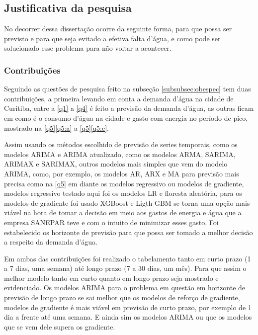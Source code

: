 \subsection{Justificativa da pesquisa} \label{subsec:justif}

No decorrer dessa dissertação ocorre da seguinte forma, para que possa ser previsto e para que seja evitado a efetiva falta d'água, e como pode ser solucionado esse problema para não voltar a acontecer.

\subsubsection{Contribui\c c\~oes} \label{subsubsec:Contribuição}

Seguindo as questões de pesquisa feito na subseção \ref{subsubsec:obespec} tem duas contribuições, a primeira levando em conta a demanda d'água na cidade de Curitiba, entre a \ref{q1} a \ref{q4} é feito a previsão da demanda d'água, as outras ficam em como é o consumo d'água na cidade e gasto com energia no período de pico, mostrado na \ref{q5}\ref{q5:a} a \ref{q5}\ref{q5:e}.

Assim usando os métodos escolhido de previsão de series temporais, como os modelos ARIMA e ARIMA atualizado, como os modelos ARMA, SARIMA, ARIMAX e SARIMAX, outros modelos mais simples que vem do modelo ARIMA, como, por exemplo, os modelos AR, ARX e MA para previsão mais precisa como na \ref{q5} em diante os modelos regressivo ou modelos de gradiente, modelos regressivo testado aqui foi os modelos LR e floresta aleatória, para os modelos de gradiente foi usado XGBoost e Ligth GBM se torna uma opção mais viável na hora de tomar a decisão em meio aos gastos de energia e água que a empresa SANEPAR teve e com o intuito de minimizar esses gasto. Foi estabelecido os horizonte de previsão para que possa ser tomado a melhor decisão a respeito da demanda d'água.

Em ambas das contribuições foi realizado o tabelamento tanto em curto prazo (1 a 7 dias, uma semana) até longo prazo (7 a 30 dias, um mês). Para que assim o melhor modelo tanto em curto quanto em longo prazo seja mostrado e evidenciado. Os modelos ARIMA para o problema em questão em horizonte de previsão de longo prazo se sai melhor que os modelos de reforço de gradiente, modelos de gradiente é mais viável em previsão de curto prazo, por exemplo de 1 dia a frente até uma semana. E ainda sim os modelos ARIMA ou que os modelos que se vem dele supera os gradiente.


